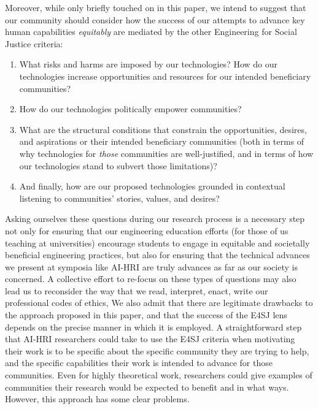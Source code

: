 \documentclass[letterpaper]{article} %
\begin{document}
Moreover, while only briefly touched on in this paper, we intend to suggest that our community should consider how the success of our attempts to advance key human capabilities \textit{equitably} are mediated by the other Engineering for Social Justice criteria:
\begin{enumerate}
\item What risks and harms are imposed by our technologies? How do our technologies increase opportunities and resources for our intended beneficiary communities?
\item How do our technologies politically empower communities?
\item What are the structural conditions that constrain the opportunities, desires, and aspirations or their intended beneficiary communities (both in terms of why technologies for \textit{those} communities are well-justified, and in terms of how our technologies stand to subvert those limitations)?
\item And finally, how are our proposed technologies grounded in contextual listening to communities' stories, values, and desires?
\end{enumerate}
Asking ourselves these questions during our research process is a necessary step not only for ensuring that our engineering education efforts (for those of us teaching at universities) encourage students to engage in equitable and societally beneficial engineering practices, but also for ensuring that the technical advances we present at symposia like AI-HRI are truly advances as far as our society is concerned. A collective effort to re-focus on these types of questions may also lead us to reconsider the way that we read, interpret, enact, write our professional codes of ethics,
We also admit that there are legitimate drawbacks to the approach proposed in this paper, and that the success of the E4SJ lens depends on the precise manner in which it is employed. A straightforward step that AI-HRI researchers could take to use the E4SJ criteria when motivating their work is to be specific about the specific community they are trying to help, and the specific capabilities their work is intended to advance for those communities. Even for highly theoretical work, researchers could give examples of communities their research would be expected to benefit and in what ways. However, this approach has some clear problems.
\end{document}
